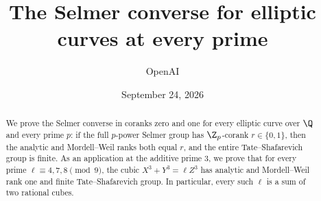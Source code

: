 \documentclass[11pt]{article}
\title{The Selmer converse for elliptic curves at every prime}
\author{OpenAI}
\date{September 24, 2026}
\begin{document}
\maketitle
\begin{abstract}
We prove the Selmer converse in coranks zero and one for every elliptic
curve over $\Q$ and every prime $p$: if the full $p$-power Selmer group
has $\Z_p$-corank $r\in\{0,1\}$, then the analytic and Mordell--Weil ranks
both equal $r$, and the entire Tate--Shafarevich group is finite.
As an application at the additive prime $3$, we prove that for every prime
$\ell\equiv4,7,8\pmod9$, the cubic $X^3+Y^3=\ell Z^3$ has analytic and
Mordell--Weil rank one and finite Tate--Shafarevich group.
In particular, every such $\ell$ is a sum of two rational cubes.
\end{abstract}
\tableofcontents










\appendix



\end{document}
